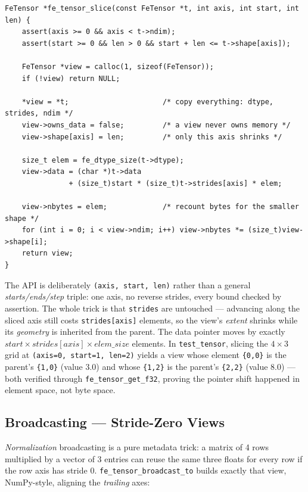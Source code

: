 \documentclass[11pt,a4paper]{article}
\begin{document}
\begin{lstlisting}[style=cstyle,caption={core/tensor.c --- slicing is three lines of arithmetic}]
FeTensor *fe_tensor_slice(const FeTensor *t, int axis, int start, int len) {
    assert(axis >= 0 && axis < t->ndim);
    assert(start >= 0 && len > 0 && start + len <= t->shape[axis]);

    FeTensor *view = calloc(1, sizeof(FeTensor));
    if (!view) return NULL;

    *view = *t;                      /* copy everything: dtype, strides, ndim */
    view->owns_data = false;         /* a view never owns memory */
    view->shape[axis] = len;         /* only this axis shrinks */

    size_t elem = fe_dtype_size(t->dtype);
    view->data = (char *)t->data
               + (size_t)start * (size_t)t->strides[axis] * elem;

    view->nbytes = elem;             /* recount bytes for the smaller shape */
    for (int i = 0; i < view->ndim; i++) view->nbytes *= (size_t)view->shape[i];
    return view;
}
\end{lstlisting}

The API is deliberately \texttt{(axis, start, len)} rather than a general
\emph{starts/ends/step} triple: one axis, no reverse strides, every bound
checked by assertion. The whole trick is that \texttt{strides} are untouched ---
advancing along the sliced axis still costs \texttt{strides[axis]} elements, so
the view's \emph{extent} shrinks while its \emph{geometry} is inherited from the
parent. The data pointer moves by exactly
$start \times strides[axis] \times elem\_size$ elements. In
\texttt{test\_tensor}, slicing the $4\times3$ grid at
\texttt{(axis=0, start=1, len=2)} yields a view whose element \texttt{\{0,0\}}
is the parent's \texttt{\{1,0\}} (value 3.0) and whose \texttt{\{1,2\}} is the
parent's \texttt{\{2,2\}} (value 8.0) --- both verified through
\texttt{fe\_tensor\_get\_f32}, proving the pointer shift happened in element
space, not byte space.

\subsection{Broadcasting --- Stride-Zero Views}

\emph{Normalization} broadcasting is a pure metadata trick: a matrix of 4 rows
multiplied by a vector of 3 entries can reuse the same three floats for every
row if the row axis has stride 0. \texttt{fe\_tensor\_broadcast\_to} builds
exactly that view, NumPy-style, aligning the \emph{trailing} axes:
\end{document}
